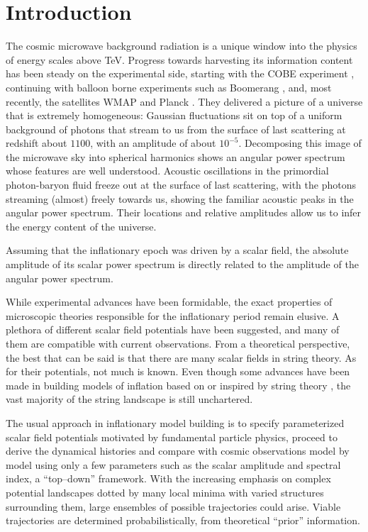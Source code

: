 \documentclass[a4paper,11pt]{article}
\begin{document}
\section{Introduction}\label{sec:scan:intro}

The cosmic microwave background radiation is a unique window into the
physics of energy scales above TeV. Progress towards harvesting
its information content has been steady on the experimental side,
starting with the COBE experiment \cite{Fixsen:1996nj}, continuing
with balloon borne experiments such as Boomerang
\cite{Netterfield:2001yq}, and, most recently, the satellites WMAP
\cite{Spergel:2003cb, Hinshaw:2006ia, Komatsu:2008hk, Komatsu2010} and
Planck \cite{Planck:2006uk}. They delivered a picture of a universe
that is extremely homogeneous: Gaussian fluctuations sit on top of a
uniform background of photons that stream to us from the surface of
last scattering at redshift about $1100$, with an amplitude of about
$10^{-5}$. Decomposing this image of the microwave sky into spherical
harmonics shows an angular power spectrum whose features are well
understood. Acoustic oscillations in the primordial photon-baryon
fluid freeze out at the surface of last scattering, with the photons
streaming (almost) freely towards us, showing the familiar acoustic
peaks in the angular power spectrum. Their locations and relative
amplitudes allow us to infer the energy content of the universe.

Assuming that the inflationary epoch was driven by a scalar field, the
absolute amplitude of its scalar power spectrum is directly related to
the amplitude of the angular power spectrum.

While experimental advances have been formidable, the exact properties
of microscopic theories responsible for the inflationary period remain
elusive. A plethora of different scalar field potentials have been
suggested, and many of them are compatible with current
observations. From a theoretical perspective, the best that can be
said is that there are many scalar fields in string theory. As for
their potentials, not much is known. Even though some advances have
been made in building models of inflation based on or inspired by
string theory \cite{KKLT, Blanco-Pillado:2004ns,
  Blanco-Pillado:2006he, KKLMMT, CQ, GKP, Silverstein:2008sg}, the
vast majority of the string landscape is still unchartered.

The usual approach in inflationary model building is to specify
parameterized scalar field potentials motivated by fundamental particle
physics, proceed to derive the dynamical histories and compare with
cosmic observations model by model using only a few parameters such as
the scalar amplitude and spectral index, a ``top--down''
framework. With the increasing emphasis on complex potential
landscapes dotted by many local minima with varied structures
surrounding them, large ensembles of possible trajectories could
arise. Viable trajectories are determined probabilistically, from
theoretical ``prior'' information.
\end{document}

